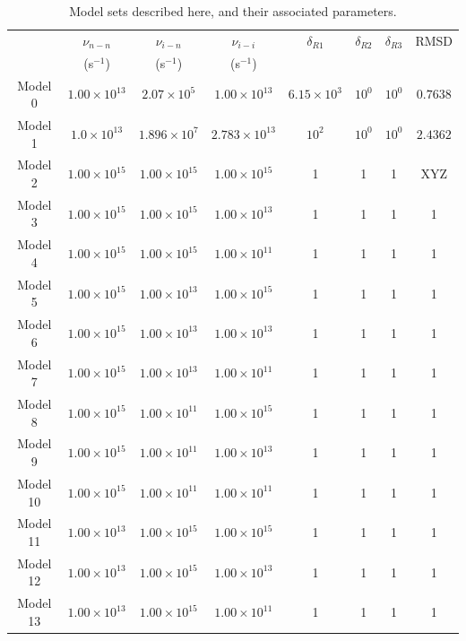 \documentclass[journal=aesccq,manuscript=draft]{achemso}
\begin{document}
\begin{table}
  \centering
    \footnotesize
  \caption{Model sets described here, and their associated parameters.}
  \label{tbl:parameters}
  \begin{tabular}{cccccccc}
    \hline
     & $\nu_{n-n}$  & $\nu_{i-n}$ & $\nu_{i-i}$ & $\delta_{R1}$ & $\delta_{R2}$ & $\delta_{R3}$ & RMSD \\
     & (s$^{-1}$)   &   (s$^{-1}$)&   (s$^{-1}$)&               &               &               &      \\                
    \hline
Model 0 & $1.00\times10^{13}$  & $2.07\times10^{5}$ & $1.00\times10^{13}$ & $6.15\times10^{3}$ & $10^{0}$ & $10^{0}$ & $0.7638$ \\
Model 1 & $1.0\times10^{13}$    & $1.896\times10^7$ & $2.783\times10^{13}$ & $10^{2}$    & $10^{0}$    & $10^{0}$    & $2.4362$ \\
Model 2  & \(1.00 \times 10^{15}\) & \(1.00 \times 10^{15}\) & \(1.00 \times 10^{15}\) & 1 & 1 & 1 & XYZ \\
Model 3  & \(1.00 \times 10^{15}\) & \(1.00 \times 10^{15}\) & \(1.00 \times 10^{13}\) & 1 & 1 & 1 & 1 \\
Model 4  & \(1.00 \times 10^{15}\) & \(1.00 \times 10^{15}\) & \(1.00 \times 10^{11}\) & 1 & 1 & 1 & 1 \\
Model 5  & \(1.00 \times 10^{15}\) & \(1.00 \times 10^{13}\) & \(1.00 \times 10^{15}\) & 1 & 1 & 1 & 1 \\
Model 6  & \(1.00 \times 10^{15}\) & \(1.00 \times 10^{13}\) & \(1.00 \times 10^{13}\) & 1 & 1 & 1 & 1 \\
Model 7  & \(1.00 \times 10^{15}\) & \(1.00 \times 10^{13}\) & \(1.00 \times 10^{11}\) & 1 & 1 & 1 & 1 \\
Model 8  & \(1.00 \times 10^{15}\) & \(1.00 \times 10^{11}\) & \(1.00 \times 10^{15}\) & 1 & 1 & 1 & 1 \\
Model 9  & \(1.00 \times 10^{15}\) & \(1.00 \times 10^{11}\) & \(1.00 \times 10^{13}\) & 1 & 1 & 1 & 1 \\
Model 10 & \(1.00 \times 10^{15}\) & \(1.00 \times 10^{11}\) & \(1.00 \times 10^{11}\) & 1 & 1 & 1 & 1 \\
Model 11 & \(1.00 \times 10^{13}\) & \(1.00 \times 10^{15}\) & \(1.00 \times 10^{15}\) & 1 & 1 & 1 & 1 \\
Model 12 & \(1.00 \times 10^{13}\) & \(1.00 \times 10^{15}\) & \(1.00 \times 10^{13}\) & 1 & 1 & 1 & 1 \\
Model 13 & \(1.00 \times 10^{13}\) & \(1.00 \times 10^{15}\) & \(1.00 \times 10^{11}\) & 1 & 1 & 1 & 1 \\

\end{tabular}
\end{table}
\end{document}
